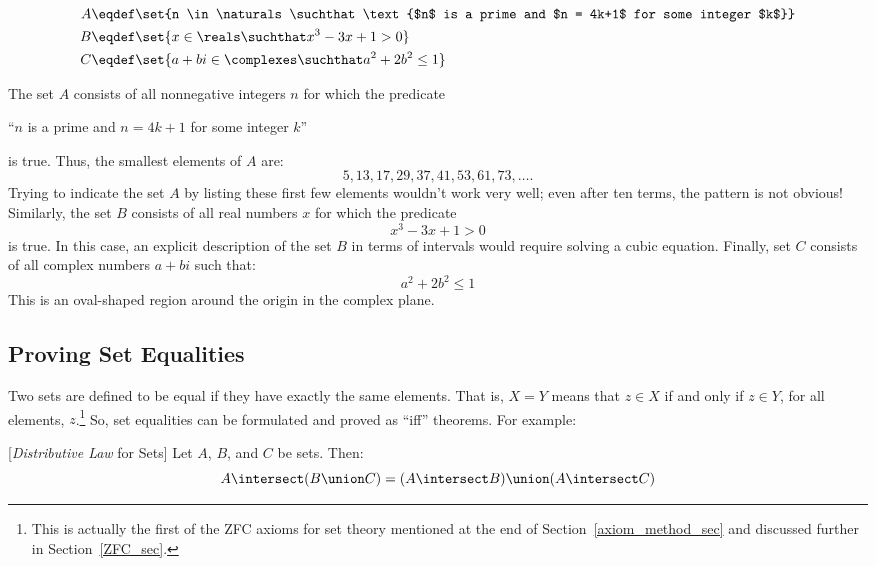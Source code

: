\begin{align*}
A & \eqdef \set{n \in \naturals \suchthat \text{$n$ is a prime and $n =
    4k+1$ for some integer $k$}} \\
B & \eqdef \set{x \in \reals \suchthat x^3 - 3 x + 1 > 0} \\
C & \eqdef \set{a + b i \in \complexes \suchthat a^2 + 2 b^2 \leq 1}
\end{align*}

The set $A$ consists of all nonnegative integers $n$ for which the
predicate
\begin{center}
``$n$ is a prime and $n = 4k+1$ for some integer $k$''
\end{center}
is true.  Thus, the smallest elements of $A$ are:
\[
5, 13, 17, 29, 37, 41, 53, 61, 73, \dots.
\]
Trying to indicate the set $A$ by listing these first few elements
wouldn't work very well; even after ten terms, the pattern is not
obvious!  Similarly, the set $B$ consists of all real numbers $x$ for
which the predicate
\[
x^3 - 3x + 1 > 0
\]
is true.  In this case, an explicit description of the set $B$ in
terms of intervals would require solving a cubic equation.  Finally,
set $C$ consists of all complex numbers $a + b i$ such that:
\[
a^2 + 2 b^2 \leq 1
\]
This is an oval-shaped region around the origin in the complex plane.

\subsection{Proving Set Equalities}\label{set_equality_sec}

Two sets are defined to be equal if they have exactly the same
elements.  That is, $X = Y$ means that $z \in X$ if and only if $z \in
Y$, for all elements, $z$.\footnote{This is actually the first of the
  ZFC axioms%
for set theory mentioned at the end of
  Section~\ref{axiom_method_sec} and discussed further in
  Section~\ref{ZFC_sec}.}  So, set equalities can be formulated and
proved as ``iff'' theorems.  For example:

\begin{theorem}\label{thm:intersect-distributivity}[\emph{Distributive Law} for Sets]%
Let $A$, $B$, and $C$ be sets.  Then:
\begin{equation}\label{set-distrib}
A \intersect (B \union C) = (A \intersect B) \union (A \intersect C)
\end{equation}
\end{theorem}

